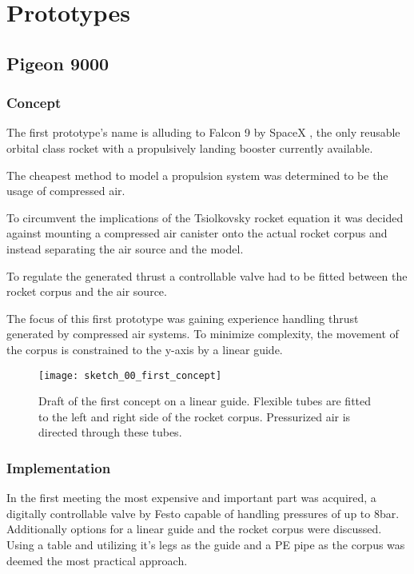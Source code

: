 \chapter{Prototypes}

\section{Pigeon 9000}

\subsection{Concept}
The first prototype's name is alluding to Falcon 9 \cite{falcon9} by SpaceX \cite{spacex}, the only reusable orbital class rocket with a propulsively landing booster currently available. 

The cheapest method to model a propulsion system was determined to be the usage of compressed air. 

To circumvent the implications of the Tsiolkovsky rocket equation \cite{rocket-equation} it was decided against mounting a compressed air canister onto the actual rocket corpus and instead separating the air source and the model.
 

To regulate the generated thrust a controllable valve had to be fitted between the rocket corpus and the air source. 

The focus of this first prototype was gaining experience handling thrust generated by compressed air systems. To minimize complexity, the movement of the corpus is constrained to the y-axis by a linear guide.

\begin{figure}[hp]
\centering

\texttt{[image: sketch\_00\_first\_concept]}

\caption{Draft of the first concept on a linear guide. Flexible tubes are fitted to the left and right side of the rocket corpus. Pressurized air is directed through these tubes.}
\end{figure}

   
\subsection{Implementation}
In the first meeting the most expensive and important part was acquired, a digitally controllable valve by Festo \cite{festo-valve} capable of handling pressures of up to 8bar. Additionally options for a linear guide and the rocket corpus were discussed. Using a table and utilizing it's legs as the guide and a PE pipe as the corpus was deemed the most practical approach. 

